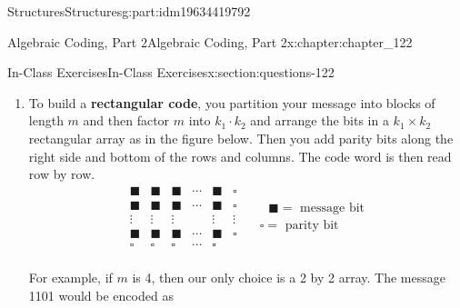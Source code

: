 \documentclass[oneside,10pt,]{book}
\newcommand{\terminology}[1]{\textbf{#1}}
\numberwithin{equation}{section}
\begin{document}
\begin{partptx}{Structures}{}{Structures}{}{}{g:part:idm19634419792}
\begin{chapterptx}{Algebraic Coding, Part 2}{}{Algebraic Coding, Part 2}{}{}{x:chapter:chapter_122}
\begin{sectionptx}{In-Class Exercises}{}{In-Class Exercises}{}{}{x:section:questions-122}
\begin{enumerate}[label=\arabic*.]
\begin{equation*}
G=\left(
\begin{array}{cccc}
1 & 0 & 1 & 0 \\
0 & 1 & 1 & 1 \\
\end{array}
\right)
\end{equation*}
%
\par
%
\begin{enumerate}[label=(\alph*)]
\item{}What size blocks does this code encode and what is the length of the code words?%
\item{}What are the code words for this code?%
\item{}With this code, can you detect single bit errors?  Can you correct all, some, or no single bit errors?%
\end{enumerate}
%
\item{}To build a \terminology{rectangular code}, you partition your message into blocks of length \(m\) and then factor \(m\) into \(k_1\cdot k_2\)  and arrange the bits in a  \(k_1 \times k_2\) rectangular array as in the figure below.  Then you add parity bits along the right side and bottom of the rows and columns.   The code word is then read row by row.%
\begin{equation*}
\begin{array}{cccccc}
\blacksquare  & \blacksquare  & \blacksquare  & \cdots  & \blacksquare  & \square  \\
\blacksquare  & \blacksquare  & \blacksquare  & \cdots  & \blacksquare  & \square  \\
\vdots  & \vdots  & \vdots  &   & \vdots  & \vdots  \\
\blacksquare  & \blacksquare  & \blacksquare  & \cdots  & \blacksquare  & \square  \\
\square  & \square  & \square  & \cdots  & \square  &   \\
\end{array}  \quad \begin{array}{c}
\textrm{      }\blacksquare  = \textrm{ message} \textrm{ bit} \\
\square  =\textrm{ parity} \textrm{ bit} \\
\end{array}
\end{equation*}
%
\par
For example, if \(m\) is 4, then our only choice is a 2 by 2 array.  The message 1101 would be encoded as%
\begin{equation*}

\end{equation*}
\end{enumerate}
\end{sectionptx}
\end{chapterptx}
\end{partptx}
\end{document}
